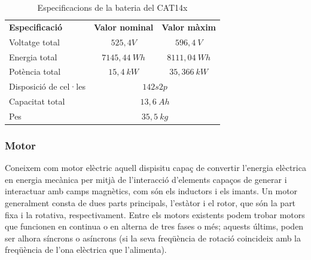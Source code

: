 {{        \begin{table}[!htb]
            \caption{ Especificacions de la bateria del CAT14x }
            \label{bateria}
            \centering
            \renewcommand{\arraystretch}{1.3}
            \tablefirsthead{}
            \tablehead{}
            \tabletail{}
            \tablelasttail{}
        
            \begin{tabular}{|l|c|c|}
                \hline
                    \textbf{ Especificació } & 
                    \textbf{ Valor nominal } &
                    \textbf{ Valor màxim } \\
                \hhline{|=|=|=|}
                    { Voltatge total } & 
                        { $525,4 V$ } & 
                        { $596,4\ V$ } \\
                \hline
                    { Energia total } & 
                        { $7145,44\ Wh$ } & 
                        { $8111,04\ Wh$ } \\
                \hline
                    { Potència total } & 
                        { $15,4\ kW$ } & 
                        { $35,366\ kW$ } \\
                \hhline{|=|=|=|}
                    { Disposició de cel·les } & 
                        \multicolumn{2}{|c|}{ $142s2p$ } \\
                \hline
                    { Capacitat total } & 
                        \multicolumn{2}{|c|}{ $13,6\ Ah$ } \\
                \hline
                    { Pes } & 
                        \multicolumn{2}{|c|}{ $35,5\ kg$ } \\
                \hline
            \end{tabular}
        \end{table}
    }

    \subsubsection{ Motor }
    {
        Coneixem com motor elèctric aquell dispisitu capaç de convertir
        l'energia elèctrica en energia mecànica per mitjà de l'interacció
        d'elements capaços de generar i interactuar amb camps magnètics, com
        són els inductors i els imants. Un motor generalment consta de dues
        parts principals, l'estàtor i el rotor, que són la part fixa i la
        rotativa, respectivament. Entre els motors existents podem trobar
        motors que funcionen en continua o en alterna de tres fases o més;
        aquests últims, poden ser alhora síncrons o asíncrons (si la seva
        freqüència de rotació coincideix amb la freqüència de l'ona elèctrica
        que l'alimenta).
    
}}
